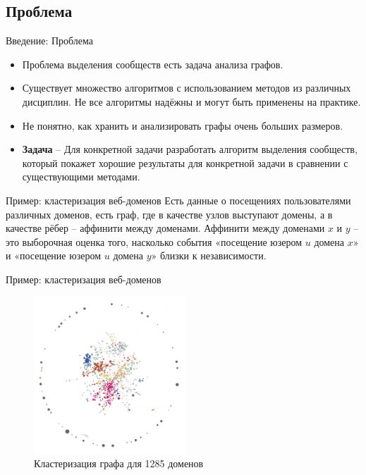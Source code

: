 \documentclass[11pt,pdf,hyperref={unicode}]{beamer}
\begin{document}
	\subsection{Проблема} %
	\label{sub:problem}
		\begin{frame}{Введение: Проблема}
			\begin{itemize}
				\item Проблема выделения сообществ есть задача анализа графов.
				\pause \item Существует множество алгоритмов с использованием методов из различных дисциплин. Не все алгоритмы надёжны и могут быть применены на практике.
				\pause \item Не понятно, как хранить и анализировать графы очень больших размеров.
				\pause \item \textbf{Задача} -- Для конкретной задачи разработать алгоритм выделения сообществ, который покажет хорошие результаты для конкретной задачи в сравнении с существующими методами.
			\end{itemize}
		\end{frame}

		\begin{frame}{Пример: кластеризация веб-доменов}
			Есть данные о посещениях пользователями различных доменов, есть граф, где в качестве узлов выступают домены, а в качестве рёбер -- аффинити между доменами. \newline
			\newline
			Аффинити между доменами $x$ и $y$ -- это выборочная оценка того, насколько события «посещение юзером $u$ домена $x$» и «посещение юзером $u$ домена $y$» близки к независимости. 
		\end{frame}

		\begin{frame}{Пример: кластеризация веб-доменов}
			\begin{figure}[h]
				\centering
				\includegraphics[width=5.7cm]{images/graph-domains.png}
				\caption{Кластеризация графа для 1285 доменов}
				\label{fig:domains}
			\end{figure}
		\end{frame}
\end{document}
